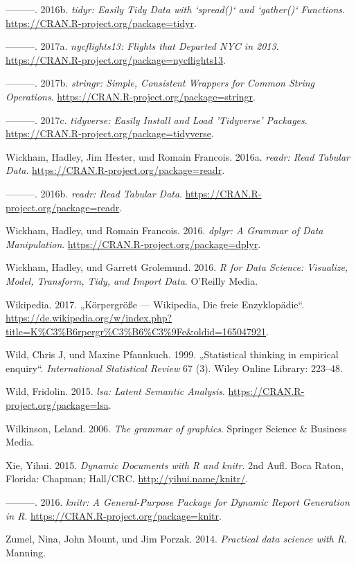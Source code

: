 \documentclass[12pt,ngerman,]{book}
\theoremstyle{definition}
\theoremstyle{definition}
\theoremstyle{remark}
\begin{document}
\hypertarget{ref-R-tidyr}{}
---------. 2016b. \emph{tidyr: Easily Tidy Data with `spread()` and
`gather()` Functions}. \url{https://CRAN.R-project.org/package=tidyr}.

\hypertarget{ref-R-nycflights13}{}
---------. 2017a. \emph{nycflights13: Flights that Departed NYC in
2013}. \url{https://CRAN.R-project.org/package=nycflights13}.

\hypertarget{ref-R-stringr}{}
---------. 2017b. \emph{stringr: Simple, Consistent Wrappers for Common
String Operations}. \url{https://CRAN.R-project.org/package=stringr}.

\hypertarget{ref-R-tidyverse}{}
---------. 2017c. \emph{tidyverse: Easily Install and Load 'Tidyverse'
Packages}. \url{https://CRAN.R-project.org/package=tidyverse}.

\hypertarget{ref-readr}{}
Wickham, Hadley, Jim Hester, und Romain Francois. 2016a. \emph{readr:
Read Tabular Data}. \url{https://CRAN.R-project.org/package=readr}.

\hypertarget{ref-R-readr}{}
---------. 2016b. \emph{readr: Read Tabular Data}.
\url{https://CRAN.R-project.org/package=readr}.

\hypertarget{ref-R-dplyr}{}
Wickham, Hadley, und Romain Francois. 2016. \emph{dplyr: A Grammar of
Data Manipulation}. \url{https://CRAN.R-project.org/package=dplyr}.

\hypertarget{ref-r4ds}{}
Wickham, Hadley, und Garrett Grolemund. 2016. \emph{R for Data Science:
Visualize, Model, Transform, Tidy, and Import Data}. O'Reilly Media.

\hypertarget{ref-wiki:groesse}{}
Wikipedia. 2017. „Körpergröße --- Wikipedia, Die freie Enzyklopädie``.
\url{https://de.wikipedia.org/w/index.php?title=K\%C3\%B6rpergr\%C3\%B6\%C3\%9Fe\&oldid=165047921}.

\hypertarget{ref-wild1999statistical}{}
Wild, Chris J, und Maxine Pfannkuch. 1999. „Statistical thinking in
empirical enquiry``. \emph{International Statistical Review} 67 (3).
Wiley Online Library: 223--48.

\hypertarget{ref-R-lsa}{}
Wild, Fridolin. 2015. \emph{lsa: Latent Semantic Analysis}.
\url{https://CRAN.R-project.org/package=lsa}.

\hypertarget{ref-wilkinson2006grammar}{}
Wilkinson, Leland. 2006. \emph{The grammar of graphics}. Springer
Science \& Business Media.

\hypertarget{ref-xie2015}{}
Xie, Yihui. 2015. \emph{Dynamic Documents with R and knitr}. 2nd Aufl.
Boca Raton, Florida: Chapman; Hall/CRC. \url{http://yihui.name/knitr/}.

\hypertarget{ref-R-knitr}{}
---------. 2016. \emph{knitr: A General-Purpose Package for Dynamic
Report Generation in R}. \url{https://CRAN.R-project.org/package=knitr}.

\hypertarget{ref-zumel2014practical}{}
Zumel, Nina, John Mount, und Jim Porzak. 2014. \emph{Practical data
science with R}. Manning.

\printindex

\backmatter
\end{document}
